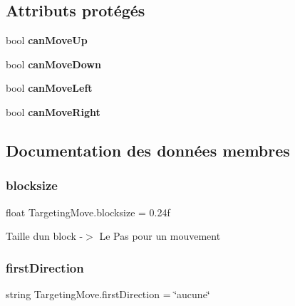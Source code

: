 \subsection*{Attributs protégés}
\begin{DoxyCompactItemize}
\item 
\mbox{\label{class_targeting_move_a9ed5ff56ed4f6b6cf1cd133e570d2ef3}} 
bool {\bfseries can\+Move\+Up}
\item 
\mbox{\label{class_targeting_move_a049058e26751a97d08a808613260c66a}} 
bool {\bfseries can\+Move\+Down}
\item 
\mbox{\label{class_targeting_move_a7cda299d69eb179eeb89739eccb666cd}} 
bool {\bfseries can\+Move\+Left}
\item 
\mbox{\label{class_targeting_move_a9ddc3ed6156e8a0ef1f02400a88c66bf}} 
bool {\bfseries can\+Move\+Right}
\end{DoxyCompactItemize}


\subsection{Documentation des données membres}
\mbox{\label{class_targeting_move_ae3c99569094a8163b09a9b9f3607e2c1}} 
\subsubsection{\texorpdfstring{blocksize}{blocksize}}
{\footnotesize\ttfamily float Targeting\+Move.\+blocksize = 0.\+24f}



Taille d\textquotesingle{}un block -\/$>$ Le Pas pour un mouvement 

\mbox{\label{class_targeting_move_a3f08aa20c9b9db6b215d8b83113c888d}} 
\subsubsection{\texorpdfstring{first\+Direction}{firstDirection}}
{\footnotesize\ttfamily string Targeting\+Move.\+first\+Direction = \char`\"{}aucune\char`\"{}}



